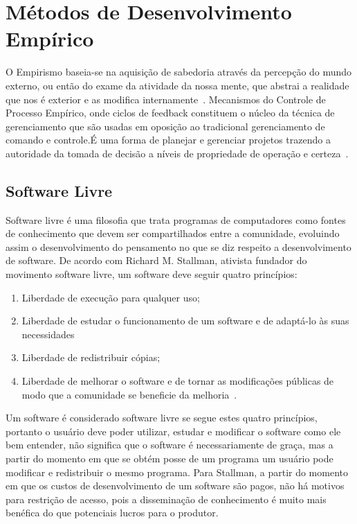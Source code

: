 \chapter{Métodos de Desenvolvimento Empírico}
\label{cap:desenvolvimento-empirico}

O Empirismo baseia-se na aquisição de sabedoria através da percepção do mundo externo, 
ou então do exame da atividade da nossa mente, que abstrai a realidade que nos
é exterior e as modifica internamente~\cite{chaui2003}.
%
Mecanismos do Controle de Processo Empírico, onde ciclos de feedback constituem o
núcleo da técnica de gerenciamento que são usadas em oposição ao tradicional 
gerenciamento de comando e controle.É uma forma de planejar e gerenciar projetos 
trazendo a autoridade da tomada de decisão a níveis de propriedade de operação e 
certeza~\cite{Schwaber2004}.
%

\section{Software Livre}

Software livre é uma filosofia que trata programas de computadores como fontes de 
conhecimento que devem ser compartilhados entre a comunidade, evoluindo assim o 
desenvolvimento do pensamento no que se diz respeito a desenvolvimento de software.
%
De acordo com Richard M. Stallman, ativista fundador do movimento software livre, 
um software deve seguir quatro princípios:
%
\begin{enumerate}
\item Liberdade de execução para qualquer uso;
\item Liberdade de estudar o funcionamento de um software e de adaptá-lo às suas necessidades
\item Liberdade de redistribuir cópias;
\item Liberdade de melhorar o software e de tornar as modificações públicas de modo que 
a comunidade se beneficie da melhoria~\cite{stallman2001}.
\end{enumerate}
%
Um software é considerado software livre se segue estes quatro princípios, portanto o 
usuário deve poder utilizar, estudar e modificar o software como ele bem entender, não 
significa que o software é necessariamente de graça, mas a partir do momento em que se 
obtém posse de um programa um usuário pode modificar e redistribuir o mesmo programa.
%
Para Stallman, a partir do momento em que os custos de desenvolvimento de um software 
são pagos, não há motivos para restrição de acesso, pois a disseminação de conhecimento 
é muito mais benéfica do que potenciais lucros para o produtor.
%

